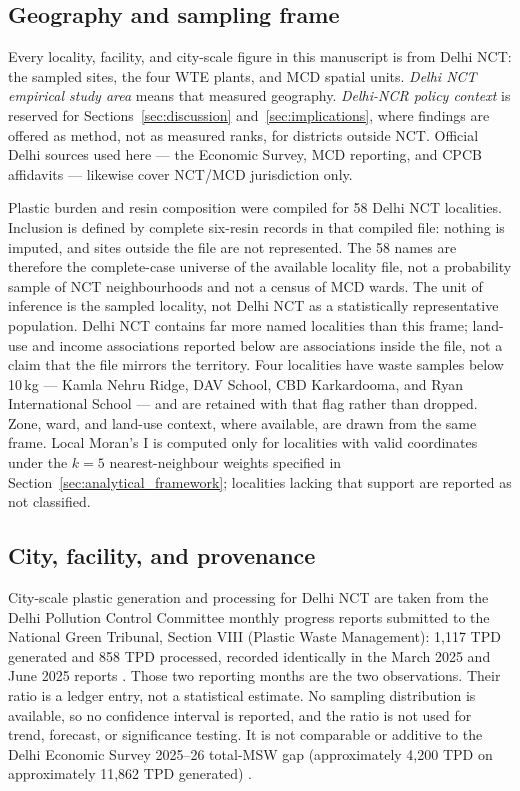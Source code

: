 \documentclass[12pt,a4paper]{article}
\begin{document}
\subsection{Geography and sampling frame}

Every locality, facility, and city-scale figure in this manuscript is from Delhi NCT: the sampled sites, the four WTE plants, and MCD spatial units. \emph{Delhi NCT empirical study area} means that measured geography. \emph{Delhi-NCR policy context} is reserved for Sections~\ref{sec:discussion} and~\ref{sec:implications}, where findings are offered as method, not as measured ranks, for districts outside NCT. Official Delhi sources used here --- the Economic Survey, MCD reporting, and CPCB affidavits \citep{delhi_eco_survey_2026,mcd_swm_ppt,ht_cpcb_affidavit_2026} --- likewise cover NCT/MCD jurisdiction only.

Plastic burden and resin composition were compiled for 58 Delhi NCT localities. Inclusion is defined by complete six-resin records in that compiled file: nothing is imputed, and sites outside the file are not represented. The 58 names are therefore the complete-case universe of the available locality file, not a probability sample of NCT neighbourhoods and not a census of MCD wards. The unit of inference is the sampled locality, not Delhi NCT as a statistically representative population. Delhi NCT contains far more named localities than this frame; land-use and income associations reported below are associations inside the file, not a claim that the file mirrors the territory. Four localities have waste samples below 10\,kg --- Kamla Nehru Ridge, DAV School, CBD Karkardooma, and Ryan International School --- and are retained with that flag rather than dropped. Zone, ward, and land-use context, where available, are drawn from the same frame. Local Moran's I is computed only for localities with valid coordinates under the $k=5$ nearest-neighbour weights specified in Section~\ref{sec:analytical_framework}; localities lacking that support are reported as not classified.

\subsection{City, facility, and provenance}

City-scale plastic generation and processing for Delhi NCT are taken from the Delhi Pollution Control Committee monthly progress reports submitted to the National Green Tribunal, Section VIII (Plastic Waste Management): 1,117 TPD generated and 858 TPD processed, recorded identically in the March 2025 and June 2025 reports \citep{dpcc_mpr_2025}. Those two reporting months are the two observations. Their ratio is a ledger entry, not a statistical estimate. No sampling distribution is available, so no confidence interval is reported, and the ratio is not used for trend, forecast, or significance testing. It is not comparable or additive to the Delhi Economic Survey 2025--26 total-MSW gap (approximately 4,200 TPD on approximately 11,862 TPD generated) \citep{delhi_eco_survey_2026,ht_delhi_63pct_2026}.
\end{document}
